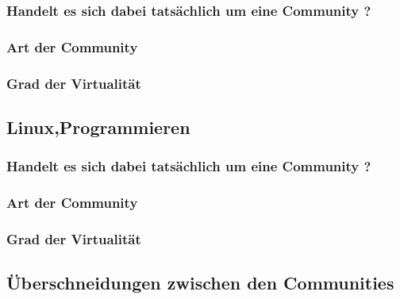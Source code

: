 \documentclass[12pt]{article}
\begin{document}
\subsubsection{Handelt es sich dabei tatsächlich um eine Community ?}
\subsubsection{Art der Community}
\subsubsection{Grad der Virtualität}
\subsection{Linux,Programmieren}
\subsubsection{Handelt es sich dabei tatsächlich um eine Community ?}
\subsubsection{Art der Community}
\subsubsection{Grad der Virtualität}
\subsection{Überschneidungen zwischen den Communities}
\pagebreak
\listoffigures
\lstlistoflistings
\end{document}
